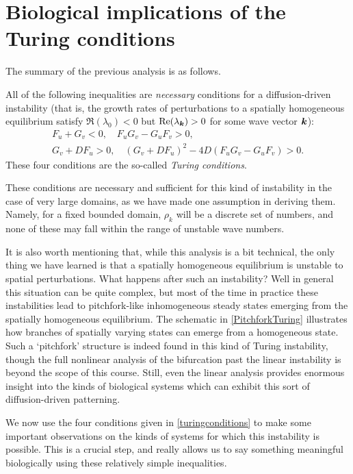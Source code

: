 \documentclass[main.tex]{subfiles}
\begin{document}
\section{Biological implications of the Turing conditions}
The summary of the previous analysis is as follows. 
\begin{info}
All of the following inequalities are \emph{necessary} conditions for a diffusion-driven instability (that is, the growth rates of perturbations to a spatially homogeneous equilibrium satisfy $\Re(\lambda_0)<0$ but $\Re(\lambda_\v{k})>0$ for some wave vector $\v{k}$):
\begin{align}
\label{turingconditions} F_u +G_v <0, \quad F_uG_v  -G_uF_v> 0,\\
\nonumber G_v + DF_u>0,\quad (G_v+ D F_u)^2 - 4 D (F_uG_v  -G_uF_v) >0.
\end{align}
These four conditions are the so-called \emph{Turing conditions}.
\end{info}
These conditions are necessary and sufficient for this kind of instability in the case of very large domains, as we have made one assumption in deriving them. Namely, for a fixed bounded domain, $\rho_k$ will be a discrete set of numbers, and none of these may fall within the range of unstable wave numbers. 

It is also worth mentioning that, while this analysis is a bit technical, the only thing we have learned is that a spatially homogeneous equilibrium is unstable to spatial perturbations. What happens after such an instability? Well in general this situation can be quite complex, but most of the time in practice these instabilities lead to pitchfork-like inhomogeneous steady states emerging from the spatially homogeneous equilibrium. The schematic in \cref{PitchforkTuring} illustrates how branches of spatially varying states can emerge from a homogeneous state. Such a `pitchfork' structure is indeed found in this kind of Turing instability, though the full nonlinear analysis of the bifurcation past the linear instability is beyond the scope of this course. Still, even the linear analysis provides enormous insight into the kinds of biological systems which can exhibit this sort of diffusion-driven patterning.

We now use the four conditions given in \cref{turingconditions} to make some important observations on the kinds of systems for which this instability is possible. This is a crucial step, and really allows us to say something meaningful biologically using these relatively simple inequalities.
\end{document}
